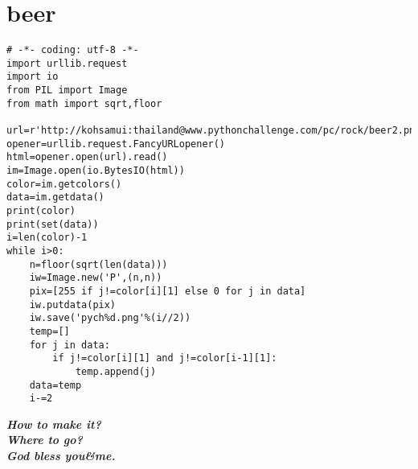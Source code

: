 \documentclass[onecolumn,a4paper,12pt]{article}
\begin{document}
\section{beer}
\begin{lstlisting}
# -*- coding: utf-8 -*-
import urllib.request
import io
from PIL import Image
from math import sqrt,floor

url=r'http://kohsamui:thailand@www.pythonchallenge.com/pc/rock/beer2.png'
opener=urllib.request.FancyURLopener()
html=opener.open(url).read()
im=Image.open(io.BytesIO(html))
color=im.getcolors()
data=im.getdata()
print(color)
print(set(data))
i=len(color)-1
while i>0:
    n=floor(sqrt(len(data)))
    iw=Image.new('P',(n,n))
    pix=[255 if j!=color[i][1] else 0 for j in data]
    iw.putdata(pix)
    iw.save('pych%d.png'%(i//2))
    temp=[]
    for j in data:
        if j!=color[i][1] and j!=color[i-1][1]:
            temp.append(j)
    data=temp
    i-=2
\end{lstlisting}

\begin{flushright}
\it\textbf{How to make it?\\Where to go?\\God bless you\&me.}
\end{flushright}
\end{document}
